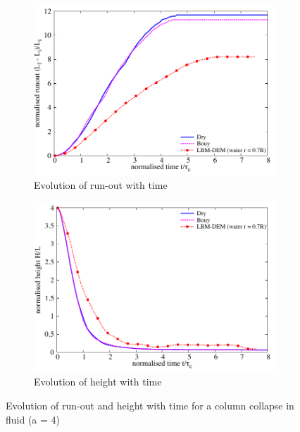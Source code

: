\begin{figure}[htpb]
\centering
\begin{subfigure}[t]{0.9\textwidth}
\centering
\includegraphics[width=\textwidth]{Runout_a4f}
\caption{Evolution of run-out with time}
\label{fig:Runout_a4f}
\end{subfigure}

\begin{subfigure}[t]{0.9\textwidth}
\centering
\includegraphics[width=\textwidth]{Height_a4f}
\caption{Evolution of height with time}
\label{fig:Height_a4f}
\end{subfigure}
\caption{Evolution of run-out and height with time for a column collapse in 
fluid (a = 4)}
\label{fig:a4f}
\end{figure}

